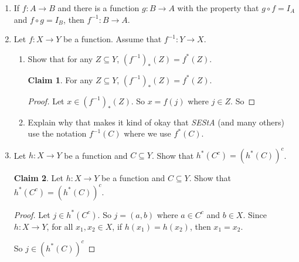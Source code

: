 \documentclass[11pt]{letter}
\theoremstyle{definition}
\newtheorem{claim}{Claim}
\begin{document}
\begin{description}
\begin{enumerate}
          
			
			\item If $f:A\rightarrow B$ and there is a function $g:B\rightarrow A$ with the property that $g\circ f=I_A$ and $f\circ g=I_B$, then $f^{-1}:B\rightarrow A$.
			
			\item Let $f:X\rightarrow Y$ be a function. Assume that $f^{-1}:Y\rightarrow X$. 
				\begin{enumerate}
				\item Show that for any $Z\subseteq Y$, $(f^{-1})_*(Z)=f^*(Z)$.
                                  \begin{claim}
                                    For any $Z\subseteq Y$, $(f^{-1})_*(Z)=f^*(Z)$.
                                  \end{claim}
                                  \begin{proof}
                                    Let $x\in (f^{-1})_*(Z)$. So $x=f(j)$ where $j\in Z$. So  
                                  \end{proof}
                                  
                                  
					\item Explain why that makes it kind of okay that {\em SEStA} (and many others) use the notation $f^{-1}(C)$ where we use $f^*(C)$. 
				\end{enumerate}
	
			      \item Let $h:X\rightarrow Y$ be a function and $C\subseteq Y$. Show that $h^*(C^c)=\left(h^*(C)\right)^c$.
                                \begin{claim}
                                  Let $h:X\rightarrow Y$ be a function and $C\subseteq Y$. Show that $h^*(C^c)=\left(h^*(C)\right)^c$.
                                \end{claim}
                                \begin{proof}
                                  Let $j\in h^*(C^c)$. So $j=(a,b)$ where $a\in C^c$ and $b\in X$. Since $h:X\rightarrow Y$, for all $x_1,x_2\in X$, if $h(x_1)=h(x_2)$, then $x_1=x_2$.

                                  So $j\in (h^*(C))^c$
                                \end{proof}
                                

\end{enumerate}
\end{description}
\end{document}
